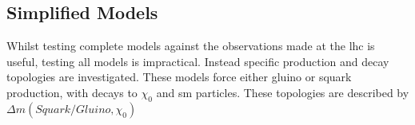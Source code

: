\subsection{Simplified Models} %
\label{sub:simplified_models}
Whilst testing complete models against the observations made at the \ac{lhc} is useful, testing all models is impractical. Instead specific production and decay topologies are investigated. These models force either gluino or squark production, with decays to $\chi_{0}$ and \ac{sm} particles. These topologies are described by $\Delta m(Squark/Gluino, \chi_{0})$ \cite{ArkaniHamed:2007fw}
































